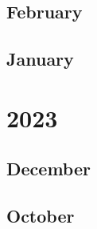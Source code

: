 \documentclass[12pt]{article}
\begin{document}

\subsection{February}
\begin{refsection}
    \nocite{groeneveld_olmo_2024}
    \printbibliography[heading=none]
\end{refsection}

\subsection{January}
\begin{refsection}
    \nocite{deepseek-ai_deepseek-v2_2024}
    \printbibliography[heading=none]
\end{refsection}


\newpage
\section{2023}
\subsection{December}
\begin{refsection}
    \nocite{gu_mamba_2024}
    \printbibliography[heading=none]
\end{refsection}

\subsection{October}
\begin{refsection}
    \nocite{jiang_mistral_2023}
    \printbibliography[heading=none]
\end{refsection}
\end{document}
